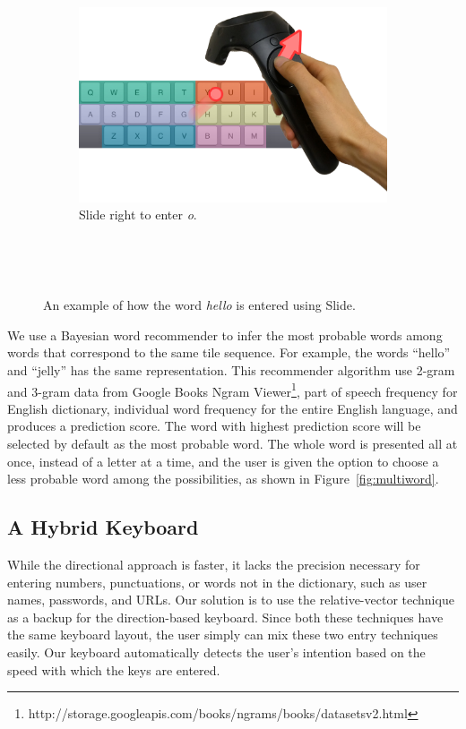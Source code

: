 \begin{figure}
  \begin{subfigure}{.6\columnwidth}
  \includegraphics[width=\textwidth]{figures/upperRight}
  \caption{Slide right to enter \textit{o}. }
  \label{fig:controllerVive}
  \end{subfigure}
  \\

  \caption{An example of how the word \textit{hello} is entered using Slide.
  }
~\label{fig:example}

\end{figure}


We use a Bayesian word recommender to infer the most probable words among words that correspond to the same tile sequence.  For example, the words ``hello'' and ``jelly'' has the same representation.  
This recommender algorithm use 2-gram and 3-gram data from Google Books Ngram Viewer\footnote{http://storage.googleapis.com/books/ngrams/books/datasetsv2.html}, part of speech frequency for English dictionary, individual word frequency for the entire English language, and produces a prediction score.
The word with highest prediction score will be selected by default as the most probable word.  
The whole word is presented all at once, instead of a letter at a time, and the user is given the option to choose a less probable word among the possibilities, as shown in Figure~\ref{fig:multiword}.  


\subsection{A Hybrid Keyboard}

While the directional approach is faster, it lacks the precision necessary for entering numbers, punctuations, or words not in the dictionary, such as user names, passwords, and URLs.   Our solution is to use the relative-vector technique as a backup for the direction-based keyboard.  Since both these techniques have the same keyboard layout, the user simply can mix these two entry techniques easily.  Our keyboard automatically detects the user's intention based on the speed with which the keys are entered. 

